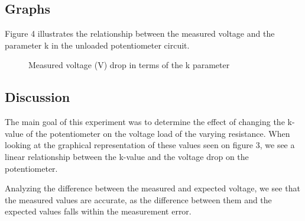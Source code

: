 \documentclass[a4paper]{article}
\newcommand{\unit}[1]{~\mathrm{#1}}
\begin{document}
\subsection{Graphs}
Figure 4 illustrates the relationship between the measured voltage and the parameter 
k in the unloaded potentiometer circuit.
\begin{figure}[!ht]
    \centering
    \caption{Measured voltage (V) drop in terms of the k parameter}
    \label{fig:3}
\end{figure}

\subsection{Discussion}
The main goal of this experiment was to determine the effect of changing the
k-value of the potentiometer on the voltage load of the varying resistance. When
looking at the graphical representation of these values seen on figure 3, we see
a linear relationship between the k-value and the voltage drop on the
potentiometer.

Analyzing the difference between the measured and expected
voltage, we see that the measured values are accurate, as the difference between
them and the expected values falls within the measurement error. 
\newpage
\end{document}

